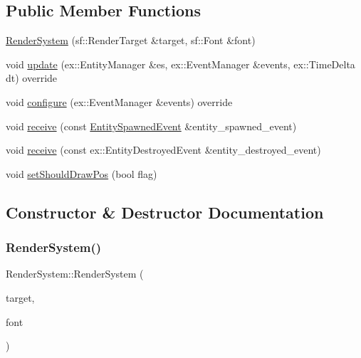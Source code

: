 \subsection*{Public Member Functions}
\begin{DoxyCompactItemize}
\item 
\hyperlink{classRenderSystem_ac21b38b1afa0eb3d3f21f6d1db5c49ad}{Render\+System} (sf\+::\+Render\+Target \&target, sf\+::\+Font \&font)
\item 
void \hyperlink{classRenderSystem_aacda55df4d6fc4ffefdad3b38b4f25f8}{update} (ex\+::\+Entity\+Manager \&es, ex\+::\+Event\+Manager \&events, ex\+::\+Time\+Delta dt) override
\item 
void \hyperlink{classRenderSystem_a58134d130c3fbb29d5cb59bd0a9480ad}{configure} (ex\+::\+Event\+Manager \&events) override
\item 
void \hyperlink{classRenderSystem_af72a474303dbd088ef9b39983e9f6a64}{receive} (const \hyperlink{classEntitySpawnedEvent}{Entity\+Spawned\+Event} \&entity\+\_\+spawned\+\_\+event)
\item 
void \hyperlink{classRenderSystem_a82e833dc520c9fa822d66b3878c0de69}{receive} (const ex\+::\+Entity\+Destroyed\+Event \&entity\+\_\+destroyed\+\_\+event)
\item 
void \hyperlink{classRenderSystem_a4877dc8f72b552e4127628fd91e3a06d}{set\+Should\+Draw\+Pos} (bool flag)
\end{DoxyCompactItemize}


\subsection{Constructor \& Destructor Documentation}
\mbox{\label{classRenderSystem_ac21b38b1afa0eb3d3f21f6d1db5c49ad}} 
\subsubsection{\texorpdfstring{Render\+System()}{RenderSystem()}}
{\footnotesize\ttfamily Render\+System\+::\+Render\+System (\begin{DoxyParamCaption}\item[{sf\+::\+Render\+Target \&}]{target,  }\item[{sf\+::\+Font \&}]{font }\end{DoxyParamCaption})\hspace{0.3cm}{\ttfamily [explicit]}}



